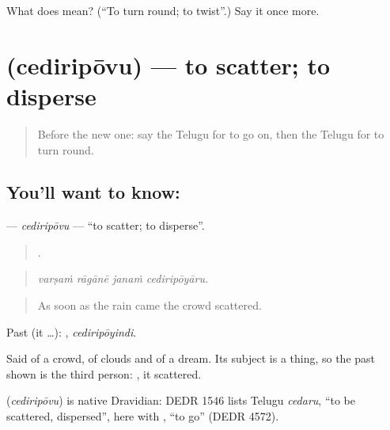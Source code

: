\begin{tcolorbox}[breakable,colback=teal!4,colframe=teal!35!black,title={Before you move on}]
What does  mean? (\textquotedblleft{}To turn round; to twist\textquotedblright{}.) Say it once more.
\end{tcolorbox}
\section[\texorpdfstring{\te{చెదిరిపోవు} (cediripōvu)}{చెదిరిపోవు (cediripōvu)}]{ (cediripōvu) — to scatter; to disperse}

\label{lesson:TE-C493-cediripovu}



\begin{quote}
Before the new one: say the Telugu for to go on, then the Telugu for to turn round.
\end{quote}

\subsection*{You'll want to know: }
\textbf{} — \emph{cediripōvu} — \textquotedblleft{}to scatter; to disperse\textquotedblright{}.

\begin{quote}
   .
\end{quote}

\begin{quote}
\emph{varṣaṁ rāgānē janaṁ cediripōyāru.}
\end{quote}

\begin{quote}
As soon as the rain came the crowd scattered.
\end{quote}

Past (it …): , \emph{cediripōyindi}.

Said of a crowd, of clouds and of a dream. Its subject is a thing, so the past shown is the third person: , it scattered.

\begin{cousinweb}
\textbf{} (\emph{cediripōvu}) is native Dravidian: DEDR 1546 lists Telugu \emph{cedaru}, \textquotedblleft{}to be scattered, dispersed\textquotedblright{}, here with , \textquotedblleft{}to go\textquotedblright{} (DEDR 4572).
\end{cousinweb}

